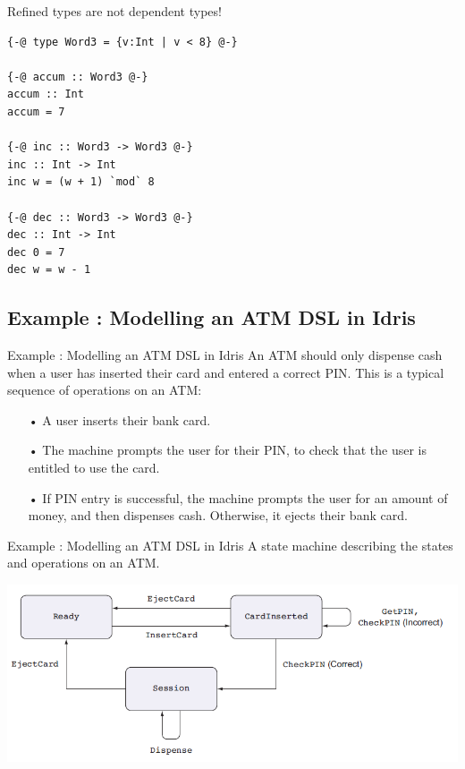 \documentclass{beamer}
\newcommand{\dsltitle}{Example : Modelling an ATM DSL in Idris}
\begin{document}
	
	\begin{frame}[fragile]{Refined types are not dependent types!}
		
		\begin{lstlisting}[basicstyle=\ttfamily\scriptsize]
{-@ type Word3 = {v:Int | v < 8} @-}
		
{-@ accum :: Word3 @-}
accum :: Int
accum = 7
			
{-@ inc :: Word3 -> Word3 @-}
inc :: Int -> Int
inc w = (w + 1) `mod` 8
		
{-@ dec :: Word3 -> Word3 @-}
dec :: Int -> Int
dec 0 = 7
dec w = w - 1
		\end{lstlisting}
		
	\end{frame}
	
	\subsection{\dsltitle}
	\begin{frame}[fragile]{\dsltitle}
		An ATM should only dispense cash when a user has inserted their
		card and entered a correct PIN. This is a typical sequence of operations on an ATM:
		\begin{enumerate}
			\item[•] A user inserts their bank card.
			\item[•] The machine prompts the user for their PIN, to check that the user is entitled to
			use the card.
			\item[•] If PIN entry is successful, the machine prompts the user for an amount of
			money, and then dispenses cash. Otherwise, it ejects their bank card.
		\end{enumerate}
	\end{frame}
	
	\begin{frame}[fragile]{\dsltitle}
		A state machine describing the states and operations on an ATM.\\
		\begin{center}
			\includegraphics[scale=0.5]{pics/atm-model}
		\end{center}
	\end{frame}
	
\end{document}
